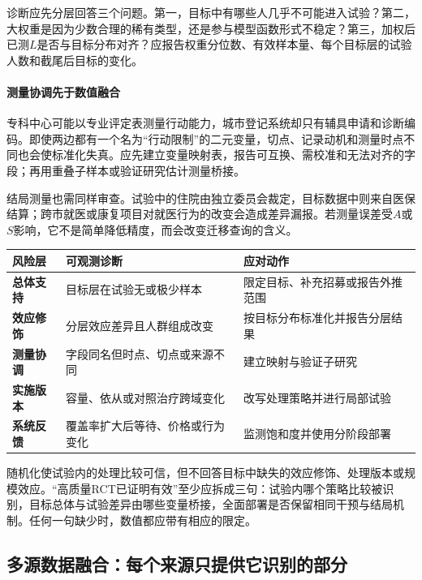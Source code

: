 诊断应先分层回答三个问题。第一，目标中有哪些人几乎不可能进入试验？第二，大权重是因为少数合理的稀有类型，还是参与模型函数形式不稳定？第三，加权后已测$L$是否与目标分布对齐？应报告权重分位数、有效样本量、每个目标层的试验人数和截尾后目标的变化。

\paragraph{测量协调先于数值融合}

专科中心可能以专业评定表测量行动能力，城市登记系统却只有辅具申请和诊断编码。即使两边都有一个名为“行动限制”的二元变量，切点、记录动机和测量时点不同也会使标准化失真。应先建立变量映射表，报告可互换、需校准和无法对齐的字段；再用重叠子样本或验证研究估计测量桥接。

结局测量也需同样审查。试验中的住院由独立委员会裁定，目标数据中则来自医保结算；跨市就医或康复项目对就医行为的改变会造成差异漏报。若测量误差受$A$或$S$影响，它不是简单降低精度，而会改变迁移查询的含义。

\begin{center}
\small
\begin{tabularx}{\textwidth}{>{\bfseries}p{2.1cm}X X}
\toprule
风险层 & 可观测诊断 & 应对动作\\
\midrule
总体支持 & 目标层在试验无或极少样本 & 限定目标、补充招募或报告外推范围\\
效应修饰 & 分层效应差异且人群组成改变 & 按目标分布标准化并报告分层结果\\
测量协调 & 字段同名但时点、切点或来源不同 & 建立映射与验证子研究\\
实施版本 & 容量、依从或对照治疗跨域变化 & 改写处理策略并进行局部试验\\
系统反馈 & 覆盖率扩大后等待、价格或行为变化 & 监测饱和度并使用分阶段部署\\
\bottomrule
\end{tabularx}
\end{center}

\begin{failurecheck}[把内部效度高写成全部人群可用]
随机化使试验内的处理比较可信，但不回答目标中缺失的效应修饰、处理版本或规模效应。“高质量RCT已证明有效”至少应拆成三句：试验内哪个策略比较被识别，目标总体与试验差异由哪些变量桥接，全面部署是否保留相同干预与结局机制。任何一句缺少时，数值都应带有相应的限定。
\end{failurecheck}

\subsection{多源数据融合：每个来源只提供它识别的部分}

